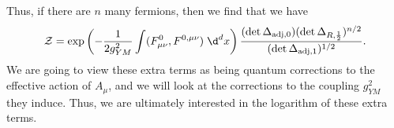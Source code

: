 \documentclass[a4paper]{article}
\begin{document}
Thus, if there are $n$ many fermions, then we find that we have %
\[
  \mathcal{Z} = \exp\left(-\frac{1}{2g_{YM}^2} \int (F_{\mu\nu}^0, F^{0, \mu\nu})\;\d^d x\right) \frac{(\det \Delta_{\mathrm{adj}, 0}) (\det \Delta_{R, \frac{1}{2}})^{n/2}}{(\det \Delta_{\mathrm{adj}, 1})^{1/2}}.
\]
We are going to view these extra terms as being quantum corrections to the effective action of $A_\mu$, and we will look at the corrections to the coupling $g_{YM}^2$ they induce. Thus, we are ultimately interested in the logarithm of these extra terms.

%
%
\end{document}
